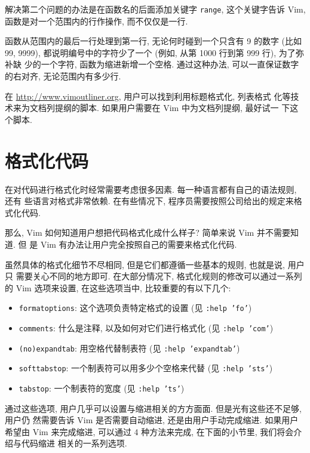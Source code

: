 解决第二个问题的办法是在函数名的后面添加关键字 \texttt{range}, 这个关键字告诉
Vim, 函数是对一个范围内的行作操作, 而不仅仅是一行.

函数从范围内的最后一行处理到第一行, 无论何时碰到一个只含有 9 的数字 (比如 99,
9999), 都说明编号中的字符少了一个 (例如, 从第 1000 行到第 999 行), 为了弥补缺
少的一个字符, 函数为缩进新增一个空格. 通过这种办法, 可以一直保证数字的右对齐,
无论范围内有多少行.

\begin{warning}
    在 \url{http://www.vimoutliner.org}, 用户可以找到利用标题格式化, 列表格式
    化等技术来为文档列提纲的脚本. 如果用户需要在 Vim 中为文档列提纲, 最好试一
    下这个脚本.
\end{warning}

\section{格式化代码}
\label{sec:formatting_code}

在对代码进行格式化时经常需要考虑很多因素. 每一种语言都有自己的语法规则, 还有
些语言对格式非常依赖. 在有些情况下, 程序员需要按照公司给出的规定来格式化代码.

那么, Vim 如何知道用户想把代码格式化成什么样子? 简单来说 Vim 并不需要知道. 但
是 Vim 有办法让用户完全按照自己的需要来格式化代码.

虽然具体的格式化细节不尽相同, 但是它们都遵循一些基本的规则, 也就是说, 用户只
需要关心不同的地方即可. 在大部分情况下, 格式化规则的修改可以通过一系列的 Vim
选项来设置, 在这些选项当中, 比较重要的有以下几个:
\begin{itemize}
    \item \texttt{formatoptions}: 这个选项负责特定格式的设置 (见 \texttt{:help
        'fo'})
    \item \texttt{comments}: 什么是注释, 以及如何对它们进行格式化 (见
        \texttt{:help 'com'})
    \item \texttt{(no)expandtab}: 用空格代替制表符 (见 \texttt{:help
        'expandtab'})
    \item \texttt{softtabstop}: 一个制表符可以用多少个空格来代替 (见
        \texttt{:help 'sts'})
    \item \texttt{tabstop}: 一个制表符的宽度 (见 \texttt{:help 'ts'})
\end{itemize}

通过这些选项, 用户几乎可以设置与缩进相关的方方面面. 但是光有这些还不足够,
用户仍
然需要告诉 Vim 是否需要自动缩进, 还是由用户手动完成缩进. 如果用户希望由 Vim
来完成缩进, 可以通过 4 种方法来完成, 在下面的小节里, 我们将会介绍与代码缩进
相关的一系列选项.

